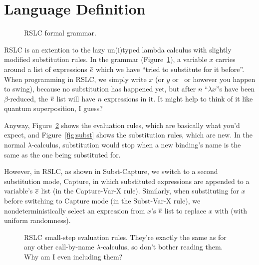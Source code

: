 \documentclass[10pt]{sigplanconf}
\begin{document}
\section{Language Definition}
\label{sec:definition}

\begin{figure}[t]
	\Grammar
	\caption{RSLC formal grammar.}
	\label{fig:grammar}
\end{figure}

RSLC is an extention to the lazy un(i)typed lambda calculus with slightly modified substitution rules. In the grammar (Figure~\ref{fig:grammar}), a variable $x$ carries around a list of expressions $\overline{e}$ which we have ``tried to substitute for it before''.
When programming in RSLC, we simply write $x$ (or $y$ or \Neptune~or however you happen to swing), because no substitution has happened yet, but after $n$ ``$\lambda x$''s have been $\beta$-reduced, the $\overline{e}$ list will have $n$ expressions in it.
It might help to think of it like quantum superposition, I guess?

Anyway, Figure~\ref{fig:eval} shows the evaluation rules, which are basically what you'd expect, and Figure~\ref{fig:subst} shows the substitution rules, which are new.
In the normal $\lambda$-calculus, substitution would stop when a new binding's name is the same as the one being substituted for.

However, in RSLC, as shown in {\sc Subst-Capture}, we switch to a second substitution mode, {\sc Capture}, in which substituted expressions are appended to a variable's $\overline{e}$ list (in the {\sc Capture-Var-X} rule).
Similarly, when substituting for $x$ before switching to {\sc Capture} mode (in the {\sc Subst-Var-X} rule), we nondeterministically select an expression from $x$'s $\overline{e}$ list to replace $x$ with (with uniform randomness).

\begin{figure}[t]
	\TypeRules{
		\EvalLam \qquad \EvalApp \qquad \EvalVar \\
		\EvalZero \qquad \EvalSucA \qquad \EvalSucB \\
		\EvalCaseA \\ \EvalCaseB \\ \EvalLet
	}
	\caption{RSLC small-step evaluation rules. They're exactly the same as for any other call-by-name $\lambda$-calculus, so don't bother reading them. Why am I even including them?}
	\label{fig:eval}
\end{figure}
\end{document}
